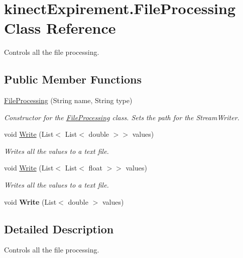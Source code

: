\hypertarget{classkinect_expirement_1_1_file_processing}{}\section{kinect\+Expirement.\+File\+Processing Class Reference}
\label{classkinect_expirement_1_1_file_processing}


Controls all the file processing.  


\subsection*{Public Member Functions}
\begin{DoxyCompactItemize}
\item 
\hyperlink{classkinect_expirement_1_1_file_processing_a7b8d9a2bd1d33f6e1379479673a0593e}{File\+Processing} (String name, String type)
\begin{DoxyCompactList}\small\item\em Constructor for the {\ttfamily \hyperlink{classkinect_expirement_1_1_file_processing}{File\+Processing}} class. Sets the path for the {\ttfamily Stream\+Writer}. \end{DoxyCompactList}\item 
void \hyperlink{classkinect_expirement_1_1_file_processing_ae8afb28ed378a0e2c5c84bcdd1ac022c}{Write} (List$<$ List$<$ double $>$$>$ values)
\begin{DoxyCompactList}\small\item\em Writes all the values to a text file. \end{DoxyCompactList}\item 
void \hyperlink{classkinect_expirement_1_1_file_processing_ab934081ab1dbf83efd6657a46b8c8bd2}{Write} (List$<$ List$<$ float $>$$>$ values)
\begin{DoxyCompactList}\small\item\em Writes all the values to a text file. \end{DoxyCompactList}\item 
void {\bfseries Write} (List$<$ double $>$ values)\hypertarget{classkinect_expirement_1_1_file_processing_ae55d0c73887aa70b0004ec83140b9974}{}\label{classkinect_expirement_1_1_file_processing_ae55d0c73887aa70b0004ec83140b9974}

\end{DoxyCompactItemize}


\subsection{Detailed Description}
Controls all the file processing. 



